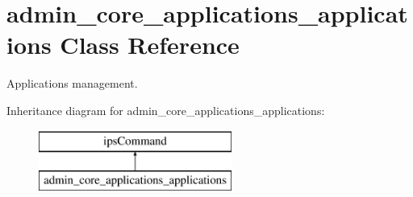 \hypertarget{classadmin__core__applications__applications}{\section{admin\-\_\-core\-\_\-applications\-\_\-applications Class Reference}
\label{classadmin__core__applications__applications}
}


Applications management.  


Inheritance diagram for admin\-\_\-core\-\_\-applications\-\_\-applications\-:\begin{figure}[H]
\begin{center}
\leavevmode
\includegraphics[height=2.000000cm]{classadmin__core__applications__applications}
\end{center}
\end{figure}
